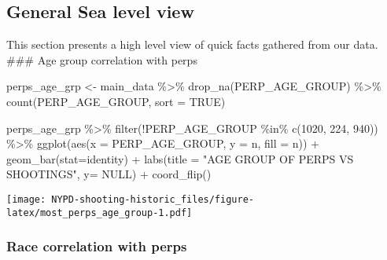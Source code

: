 \documentclass[
]{article}
\newenvironment{Shaded}{\begin{snugshade}}{\end{snugshade}}
\newcommand{\AttributeTok}[1]{\textcolor[rgb]{0.77,0.63,0.00}{#1}}
\newcommand{\ConstantTok}[1]{\textcolor[rgb]{0.00,0.00,0.00}{#1}}
\newcommand{\FunctionTok}[1]{\textcolor[rgb]{0.00,0.00,0.00}{#1}}
\newcommand{\NormalTok}[1]{#1}
\newcommand{\OtherTok}[1]{\textcolor[rgb]{0.56,0.35,0.01}{#1}}
\newcommand{\SpecialCharTok}[1]{\textcolor[rgb]{0.00,0.00,0.00}{#1}}
\newcommand{\StringTok}[1]{\textcolor[rgb]{0.31,0.60,0.02}{#1}}
\begin{document}
\hypertarget{general-sea-level-view}{%
\subsection{General Sea level view}\label{general-sea-level-view}}

This section presents a high level view of quick facts gathered from our
data. \#\#\# Age group correlation with perps

\begin{Shaded}
\begin{Highlighting}[]
\NormalTok{perps\_age\_grp }\OtherTok{\textless{}{-}}\NormalTok{ main\_data }\SpecialCharTok{\%\textgreater{}\%} \FunctionTok{drop\_na}\NormalTok{(PERP\_AGE\_GROUP) }\SpecialCharTok{\%\textgreater{}\%} \FunctionTok{count}\NormalTok{(PERP\_AGE\_GROUP, }\AttributeTok{sort =} \ConstantTok{TRUE}\NormalTok{)}

\NormalTok{perps\_age\_grp }\SpecialCharTok{\%\textgreater{}\%} \FunctionTok{filter}\NormalTok{(}\SpecialCharTok{!}\NormalTok{PERP\_AGE\_GROUP }\SpecialCharTok{\%in\%} \FunctionTok{c}\NormalTok{(}\StringTok{\textquotesingle{}1020\textquotesingle{}}\NormalTok{, }\StringTok{\textquotesingle{}224\textquotesingle{}}\NormalTok{, }\StringTok{\textquotesingle{}940\textquotesingle{}}\NormalTok{)) }\SpecialCharTok{\%\textgreater{}\%} \FunctionTok{ggplot}\NormalTok{(}\FunctionTok{aes}\NormalTok{(}\AttributeTok{x =}\NormalTok{ PERP\_AGE\_GROUP, }\AttributeTok{y =}\NormalTok{ n, }\AttributeTok{fill =}\NormalTok{ n)) }\SpecialCharTok{+} \FunctionTok{geom\_bar}\NormalTok{(}\AttributeTok{stat=}\StringTok{\textquotesingle{}identity\textquotesingle{}}\NormalTok{) }\SpecialCharTok{+} \FunctionTok{labs}\NormalTok{(}\AttributeTok{title =} \StringTok{"AGE GROUP OF PERPS VS SHOOTINGS"}\NormalTok{, }\AttributeTok{y=} \ConstantTok{NULL}\NormalTok{) }\SpecialCharTok{+} \FunctionTok{coord\_flip}\NormalTok{()}
\end{Highlighting}
\end{Shaded}

\texttt{[image: NYPD-shooting-historic\_files/figure-latex/most\_perps\_age\_group-1.pdf]}

\hypertarget{race-correlation-with-perps}{%
\subsubsection{Race correlation with
perps}\label{race-correlation-with-perps}}
\end{document}
